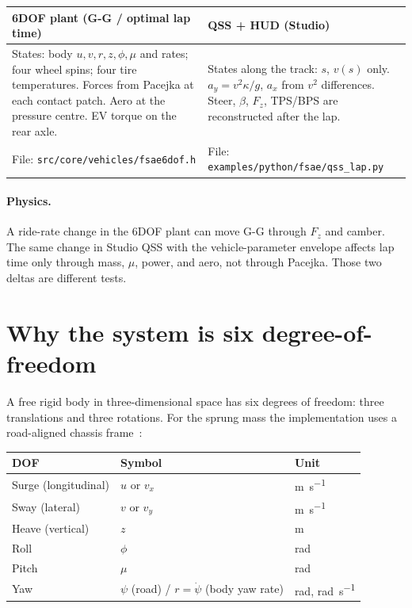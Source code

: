\documentclass[11pt,letterpaper]{article}
\newcommand{\eng}[1]{\paragraph{Physics.} #1}
\begin{document}
\begin{center}
\begin{tabular}{@{}p{}p{}@{}}
\toprule
\textbf{6DOF plant (G-G / optimal lap time)} &
\textbf{QSS + HUD (Studio)} \\
\midrule
States: body $u,v,r,z,\phi,\mu$ and rates;
four wheel spins; four tire temperatures.
Forces from Pacejka at each contact patch.
Aero at the pressure centre.
EV torque on the rear axle.
&
States along the track: $s$, $v(s)$ only.
$a_y = v^2 \kappa / g$, $a_x$ from
$v^2$ differences.
Steer, $\beta$, $F_z$, TPS/BPS are
reconstructed after the lap. \\
\midrule
File: \texttt{src/core/vehicles/fsae6dof.h} &
File: \texttt{examples/python/fsae/qss\_lap.py} \\
\bottomrule
\end{tabular}
\end{center}

\eng{A ride-rate change in the 6DOF plant can move G-G through $F_z$
and camber. The same change in Studio QSS with the vehicle-parameter
envelope affects lap time only through mass, $\mu$, power, and aero,
not through Pacejka. Those two deltas are different tests.}

\section{Why the system is six degree-of-freedom}
\label{sec:why6}

A free rigid body in three-dimensional space has six degrees of
freedom: three translations and three rotations. For the sprung mass
the implementation uses a road-aligned chassis
frame~\cite{manzanero-fastestlap,genta}:

\begin{center}
\begin{tabular}{@{}lll@{}}
\toprule
DOF & Symbol & Unit \\
\midrule
Surge (longitudinal) & $u$ or $v_x$          & \si{\metre\per\second} \\
Sway (lateral)        & $v$ or $v_y$          & \si{\metre\per\second} \\
Heave (vertical)      & $z$                   & \si{\metre} \\
Roll                   & $\phi$                & \si{\radian} \\
Pitch                  & $\mu$                 & \si{\radian} \\
Yaw & $\psi$ (road) / $r=\dot\psi$ (body yaw rate)
    & \si{\radian}, \si{\radian\per\second} \\
\bottomrule
\end{tabular}
\end{center}
\end{document}
